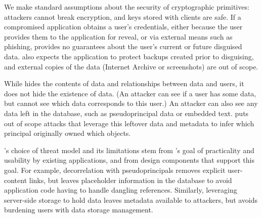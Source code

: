 %
We make standard assumptions about the security of cryptographic primitives:
attackers cannot break encryption, and keys stored with clients are safe.
%
If a compromised application obtains a user's credentials, either because the
user provides them to the application for reveal, or via external means such as
phishing, \sys provides no guarantees about the user's current or future
disguised data.
%
\sys also expects the application to protect backups created prior to
disguising, and external copies of the data (\eg Internet Archive or
screenshots) are out of scope.
%

%
While \sys hides the contents of \xxed data and relationships between \xxed data
and users, it does not hide the existence of
\xxed data. (An attacker can see if
a user has \xxed some data, but cannot see which \xxed data corresponds to this
user.)
%
An attacker can also see any data left in the database, such as pseudoprincipal
data or embedded text.
%
\sys puts out of scope attacks that leverage this leftover data
and metadata to infer which principal originally owned which objects.
%

\sys's choice of threat model and its limitations stem from
\sys's goal of practicality and usability by existing applications, and
from design components that support this goal.
%
For example, decorrelation with pseudoprincipals removes explicit user-content
links, but leaves placeholder information in the database to avoid application
code having to handle dangling references.
%
Similarly, leveraging server-side storage to hold \xxed data leaves
metadata available to attackers, but avoids burdening users with data storage
management.
